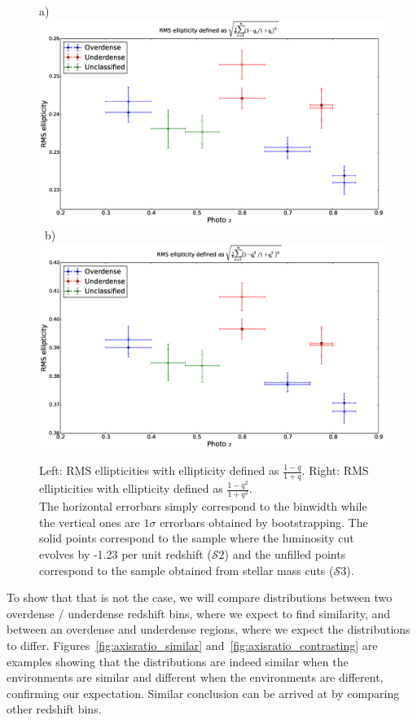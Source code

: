 \documentclass[twocolumn,useAMS,usenatbib]{mn2e}
\newcommand{\s}{\ensuremath{\mathcal{S}}}
\begin{document}
\begin{figure}
 \centering
 a) \includegraphics[width=0.9\columnwidth]{rms_ellip1_Bbandevolution_masscut.eps} \
 b) \includegraphics[width=0.9\columnwidth]{rms_ellip2_Bbandevolution_masscut.eps} \\
 \caption{Left: RMS ellipticities with ellipticity defined as $\frac{1-q}{1+q}$. \; 
          Right: RMS ellipticities with ellipticity defined as $\frac{1-q^2}{1+q^2}$.\\ The horizontal errorbars simply correspond to the binwidth while the vertical ones
          are $1\sigma$ errorbars obtained by bootstrapping. The solid points correspond to the sample where the luminosity cut evolves by -1.23 per unit redshift (\s$2$) and the unfilled
          points correspond to the sample obtained from stellar mass cuts (\s$3$).}
 \label{fig:rms_ellip_Bband_mass}
\end{figure}

To show that that is not the case, we will compare distributions between two overdense / underdense redshift bins, where we expect to find similarity, and between an overdense and underdense regions,
where we expect the distributions to differ.
Figures~\ref{fig:axisratio_similar} and~\ref{fig:axisratio_contrasting} are examples showing that the distributions are indeed similar when the environments are similar and different when the environments are different, confirming our expectation.
Similar conclusion can be arrived at by comparing other redshift bins.
\end{document}
